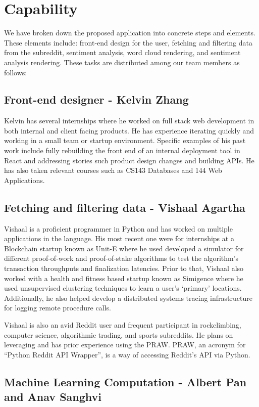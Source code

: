 \documentclass[11pt]{article}
\begin{document}
\section{Capability}
\tab We have broken down the proposed application into concrete steps and elements. These elements include: front-end design for the user, fetching and filtering data from the subreddit, sentiment analysis, word cloud rendering, and sentiment analysis rendering. These tasks are distributed among our team members as follows:

\subsection{Front-end designer - Kelvin Zhang}
\tab Kelvin has several internships where he worked on full stack web development in both internal and client facing products. He has experience iterating quickly and working in a small team or startup environment. Specific examples of his past work include fully rebuilding the front end of an internal deployment tool in React and addressing stories such product design changes and building APIs. He has also taken relevant courses such as CS143 Databases and 144 Web Applications.

\subsection{Fetching and filtering data - Vishaal Agartha}
\tab Vishaal is a proficient programmer in Python and has worked on multiple applications in the language. His most recent one were for internships at a Blockchain startup known as Unit-E where he used developed a simulator for different proof-of-work and proof-of-stake algorithms to test the algorithm’s transaction throughputs and finalization latencies. Prior to that, Vishaal also worked with a health and fitness based startup known as Simigence where he used unsupervised clustering techniques to learn a user’s ‘primary’ locations. Additionally, he also helped develop a distributed systems tracing infrastructure for logging remote procedure calls.
	\par Vishaal is also an avid Reddit user and frequent participant in rockclimbing, computer science, algorithmic trading, and sports subreddits. He plans on leveraging and has prior experience using the PRAW. PRAW, an acronym for “Python Reddit API Wrapper”, is a way of accessing Reddit’s API via Python.

\subsection{Machine Learning Computation - Albert Pan and Anav Sanghvi}
\end{document}

